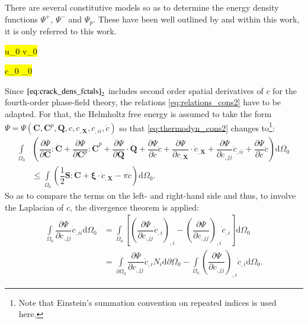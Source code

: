 There are several constitutive models so as to determine the energy density functions $\Psi^{+}$, $\Psi^{-}$ and $\Psi_{p}$. These have been well outlined by \citet{03_PF_ductile} and within this work, it is only referred to this work. 

\hl{ u_{0} \text{ } v_{0} }

\hl{ c_{0}  _{0} }


Since $\eqref{eq:crack_dens_fctals}_{2}$ includes second order spatial derivatives of $c$ for the fourth-order phase-field theory, the relations \eqref{eq:relations_cons2} have to be adapted. For that, the Helmholtz free energy is assumed to take the form $\Psi=\Psi\left(\mathbf{C},\mathbf{C}^{p},\mathbf{Q},c,c_{,\mathbf{X}},c_{,ii},\dot{c}\right)$ so that \eqref{eq:thermodyn_cons2} changes to\footnote{Note that Einstein's summation convention on repeated indices is used here.}:
\begin{equation} \label{eq:thermodyn_cons4}
	\begin{aligned}
	\int\limits_{\Omega_{0}}&\left(\dfrac{\partial\Psi}{\partial\mathbf{C}}:\dot{\mathbf{C}}+\dfrac{\partial\Psi}{\partial\mathbf{C}^{p}}:\dot{\mathbf{C}}^{p}+\dfrac{\partial\Psi}{\partial\mathbf{Q}}\cdot\dot{\mathbf{Q}}+\dfrac{\partial\Psi}{\partial c}\dot{c}+\dfrac{\partial\Psi}{\partial c_{,\mathbf{X}}}\cdot\dot{c}_{,\mathbf{X}}+\dfrac{\partial\Psi}{\partial c_{,jj}}\dot{c}_{,ii}+\dfrac{\partial\Psi}{\partial\dot{c}}\ddot{c}\right)\mathrm{d}\Omega_{0} \\
	&\leq \int\limits_{\Omega_{0}}\left(\dfrac{1}{2}\mathbf{S}:\dot{\mathbf{C}}+\bm{\xi}\cdot\dot{c}_{,\mathbf{X}}-\pi\dot{c}\right)\mathrm{d}\Omega_{0}.
	\end{aligned}
\end{equation}
So as to compare the terms on the left- and right-hand side and thus, to involve the Laplacian of $c$, the divergence theorem is applied:
\begin{equation} \label{eq:div_theorem_Lapl_c}
	\begin{aligned}
		\int\limits_{\Omega_{0}}\dfrac{\partial\Psi}{\partial c_{,jj}}\dot{c}_{,ii}\mathrm{d}\Omega_{0} &= \int\limits_{\Omega_{0}}\left[\left(\dfrac{\partial\Psi}{\partial c_{,jj}}\dot{c}_{,i}\right)_{,i}-\left(\dfrac{\partial\Psi}{\partial c_{,jj}}\right)_{,i}\dot{c}_{,i}\right]\mathrm{d}\Omega_{0} \\
		&= \int\limits_{\partial\Omega_{0}}\dfrac{\partial\Psi}{\partial c_{,jj}}\dot{c}_{,i}N_{i}\mathrm{d}\partial\Omega_{0}-\int\limits_{\Omega_{0}}\left(\dfrac{\partial\Psi}{\partial c_{,jj}}\right)_{,i}\dot{c}_{,i}\mathrm{d}\Omega_{0}.
	\end{aligned}
\end{equation}
